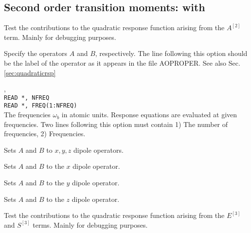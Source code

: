 \subsection{Second order transition moments:  with }


\begin{description}

\item{}
Test the contributions to the quadratic response function arising from
the $A^{\left[2\right]}$ term. Mainly for debugging purposes.

\item[\Key{APROP}, \Key{BPROP}]
Specify the operators $A$ and $B$, respectively. The line following this
option should be the label of the operator as it appears in the file
AOPROPER. See also Sec.\ref{sec:quadraticrsp}

\item{, }\\
\verb|READ *, NFREQ|\\
\verb|READ *, FREQ(1:NFREQ)|\\
The frequencies $\omega_b$ in atomic units.
Response equations are evaluated at given
frequencies. Two lines
following this option must contain 1) The number of frequencies, 2)
Frequencies.

\item{}
Sets $A$ and $B$ to $x, y, z$ dipole operators.

\item{}
Sets $A$ and $B$ to the $x$ dipole operator.

\item{}
Sets $A$ and $B$ to the $y$ dipole operator.

\item{}
Sets $A$ and $B$ to the $z$ dipole operator.

\item{}
Test the contributions to the quadratic response function arising from
the $E^{\left[3\right]}$ and $S^{\left[3\right]}$ terms.  Mainly for
debugging purposes.


\end{description}
